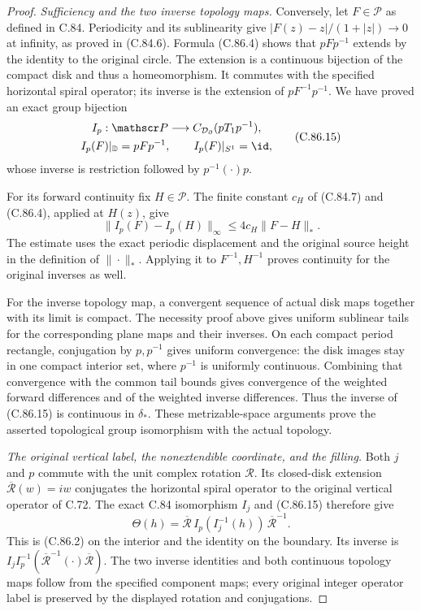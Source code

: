 \begin{proof}
\emph{Sufficiency and the two inverse topology maps.}
Conversely, let $F\in\mathscr P$ as
defined in C.84. Periodicity and its
sublinearity give
$|F(z)-z|/(1+|z|)\to0$ at infinity,
as proved in (C.84.6). Formula (C.86.4)
shows that $pFp^{-1}$ extends by the
identity to the original circle.
The extension is a continuous bijection
of the compact disk and thus a
homeomorphism. It commutes with the
specified horizontal spiral operator;
its inverse is the extension of
$pF^{-1}p^{-1}$. We have proved an
exact group bijection
\[
 \begin{gathered}
 I_p:\mathscr P\longrightarrow
        C_{\mathcal D_\partial}(pT_1p^{-1}),\\
 I_p(F)|_{\mathbb D}=pFp^{-1},\qquad
 I_p(F)|_{S^1}=\id,
 \end{gathered}                                                   \tag{C.86.15}
\]
whose inverse is restriction followed
by $p^{-1}(\cdot)p$.

For its forward continuity fix $H\in\mathscr P$.
The finite constant $c_H$ of (C.84.7)
and (C.86.4), applied at $H(z)$, give
\[
 \|I_p(F)-I_p(H)\|_\infty
          \leq4c_H\|F-H\|_*.
                                                               \tag{C.86.16}
\]
The estimate uses the exact periodic
displacement and the original source
height in the definition of $\|\cdot\|_*$.
Applying it to $F^{-1},H^{-1}$ proves
continuity for the original inverses
as well.

For the inverse topology map, a
convergent sequence of actual disk
maps together with its limit is
compact. The necessity proof above
gives uniform sublinear tails for
the corresponding plane maps and
their inverses. On each compact
period rectangle, conjugation by
$p,p^{-1}$ gives uniform convergence:
the disk images stay in one compact
interior set, where $p^{-1}$ is
uniformly continuous. Combining that
convergence with the common tail
bounds gives convergence of the
weighted forward differences and
of the weighted inverse differences.
Thus the inverse of (C.86.15) is
continuous in $\delta_*$.
These metrizable-space arguments prove
the asserted topological group
isomorphism with the actual topology.

\emph{The original vertical label, the nonextendible coordinate, and the filling.}
Both $j$ and $p$ commute with the
unit complex rotation $\mathcal R$.
Its closed-disk extension $\overline{\mathcal R}(w)=iw$
conjugates the horizontal spiral
operator to the original vertical
operator of C.72. The exact C.84
isomorphism $I_j$ and (C.86.15)
therefore give
\[
 \Theta(h)=\overline{\mathcal R}\,
               I_p(I_j^{-1}(h))\,
                    \overline{\mathcal R}^{-1}.
                                                               \tag{C.86.17}
\]
This is (C.86.2) on the interior and
the identity on the boundary.
Its inverse is
$I_j I_p^{-1}(\overline{\mathcal R}^{-1}(\cdot)
\overline{\mathcal R})$.
The two inverse identities and
both continuous topology maps follow
from the specified component maps;
every original integer operator
label is preserved by the displayed
rotation and conjugations.


\end{proof}
